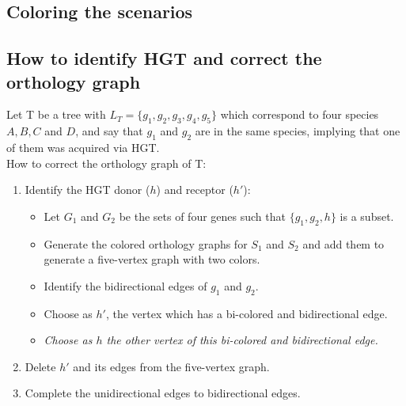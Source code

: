 \documentclass[10pt,a4paper,notitlepage]{report}
\begin{document}
\subsection{Coloring the scenarios}

\subsection{How to identify HGT and correct the orthology graph}
	Let T be a tree with $L_T=\{ g_1, g_2, g_3, g_4, g_5\}$ which correspond to four species $A, B, C$ and $D$, and say that $g_1$ and $g_2$ are in the same species, implying that one of them was acquired via HGT. 
	\\
	How to correct the orthology graph of T:
	\begin{enumerate}
		\item Identify the HGT donor ($h$) and receptor ($h'$):
			\begin{itemize}
				\item Let $G_1$ and $G_2$ be the sets of four genes such that $\{g_1, g_2, h\}$ is a subset.
				\item Generate the colored orthology graphs for $S_1$ and $S_2$ and add them to generate a five-vertex graph with 					two colors.
				\item Identify the bidirectional edges of $g_1$ and $g_2$.
				\item Choose as $h'$, the vertex which has a bi-colored and bidirectional edge.
				\item \textit{Choose as $h$ the other vertex of this bi-colored and bidirectional edge.}
			\end{itemize}
		\item Delete $h'$ and its edges from the five-vertex graph.
		\item Complete the unidirectional edges to bidirectional edges. 
	\end{enumerate}
	
\end{document}
